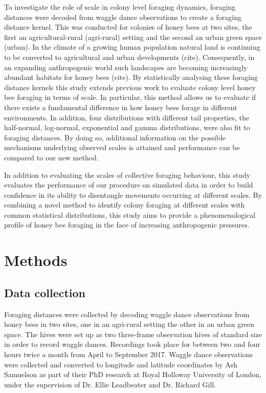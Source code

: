 \documentclass[11pt,usenames,dvipsnames,a4paper]{article}
\begin{document}
\begin{linenumbers}
To investigate the role of scale in colony level foraging dynamics, foraging distances were decoded from waggle dance observations to create a foraging distance kernel. This was conducted for colonies of honey bees at two sites, the first an agricultural-rural (agri-rural) setting and the second an urban green space (urban). In the climate of a growing human population natural land is continuing to be converted to agricultural and urban developments (cite). Consequently, in an expanding anthropogenic world such landscapes are becoming increasingly abundant habitats for honey bees (cite). By statistically analysing these foraging distance kernels this study extends previous work to evaluate colony level honey bee foraging in terms of scale. In particular, this method allows us to evaluate if there exists a fundamental difference in how honey bees forage in different environments. In addition, four distributions with different tail properties, the half-normal, log-normal, exponential and gamma distributions, were also fit to foraging distances. By doing so, additional information on the possible mechanisms underlying observed scales is attained and performance can be compared to our new method.

In addition to evaluating the scales of collective foraging behaviour, this study evaluates the performance of our procedure on simulated data in order to build confidence in its ability to disentangle movements occurring at different scales. By combining a novel method to identify colony foraging at different scales with common statistical distributions, this study aims to provide a phenomenological profile of honey bee foraging in the face of increasing anthropogenic pressures.
\end{linenumbers}
	
\section{Methods}

\subsection{Data collection}

\begin{linenumbers}
\hspace{\parindent}
Foraging distances were collected by decoding waggle dance observations from honey bees in two sites, one in an agri-rural setting the other in an urban green space. The hives were set up as two three-frame observation hives of standard size in order to record waggle dances. Recordings took place for between two and four hours twice a month from April to September 2017. Waggle dance observations were collected and converted to longitude and latitude coordinates by Ash Samuelson as part of their PhD research at Royal Holloway University of London, under the supervision of Dr. Ellie Leadbeater and Dr. Richard Gill.
\end{linenumbers}
\end{document}
